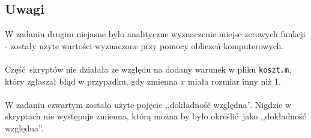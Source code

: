\documentclass[a4paper, 12pt]{article}
\begin{document}
		\subsection{Uwagi}
			W zadaniu drugim niejasne było analityczne wyznaczenie miejsc zerowych funkcji - zostały użyte  wartości wyznaczone przy pomocy obliczeń komputerowych.
			\\ \\ \noindent
			Część skryptów nie działała ze względu na dodany warunek w pliku \texttt{koszt.m}, który zgłaszał błąd w przypadku, gdy zmienna $x$ miała rozmiar inny niż 1.
			\\ \\ \noindent
			W zadaniu czwartym zostało użyte pojęcie ,,dokładność względna''. Nigdzie w skryptach nie występuje zmienna, którą można by było określić jako ,,dokładność względna''.
\end{document}

